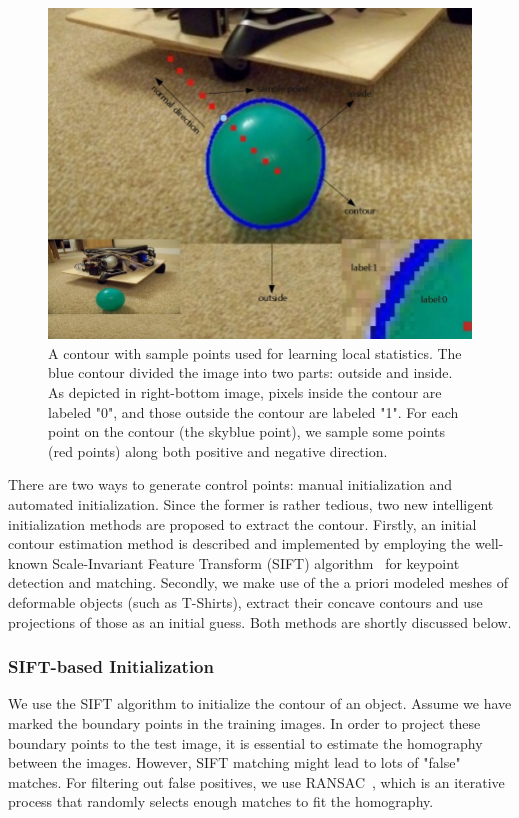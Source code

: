\documentclass[conference]{IEEEtran}
\begin{document}
\begin{figure}[htb]
  \centering
  \includegraphics[width=\columnwidth]{images/cont.jpg}
\caption{A contour with sample points used for learning local statistics. The blue contour
  divided the image into two parts: outside and inside. As depicted in
  right-bottom image, pixels inside the contour are labeled "0",
  and those outside the contour are labeled "1". For each point on the
  contour (the skyblue point), we sample some points (red points) along both positive
  and negative direction.}
\label{fig:prior}
\end{figure}

There are two ways to generate control points:
manual initialization and automated initialization. 
Since the former is rather tedious, two new
intelligent initialization methods are proposed to extract the
contour. Firstly, an initial contour estimation method is described and
implemented by employing the well-known Scale-Invariant Feature Transform 
(SIFT) algorithm~\cite{lowe2004distinctive} for
keypoint detection and matching. Secondly, we make use of the a priori
modeled meshes of deformable objects (such as T-Shirts), extract their
concave contours and use projections of those as an initial guess. Both 
methods are shortly discussed below.

\subsubsection{SIFT-based Initialization}
\label{sec:sift}
We use the SIFT algorithm to initialize the
contour of an object. Assume we have marked the boundary points in the
training images. In order to project these boundary points to the test
image, it is essential to estimate the homography between the
images. However, SIFT matching might lead to lots of "false" matches.
For filtering out false positives, we use RANSAC~\cite{fischler1981random}, 
which is an iterative process that randomly selects enough matches to fit the
homography.
\end{document}
